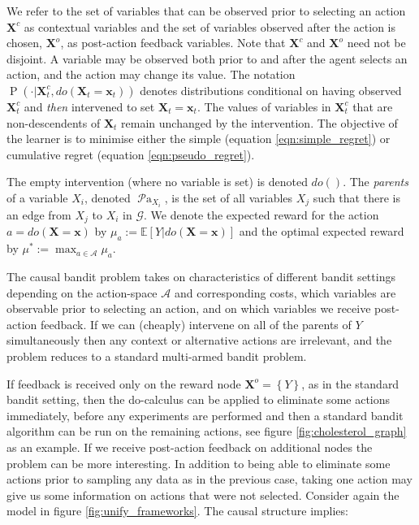 \documentclass[11pt,a4paper,twoside]{report}
\newcommand{\actions}{\mathcal{A}}
\newcommand{\actionspace}{\mathcal{A}}
\newcommand{\E}[1]{\mathbb E\left[{#1}\right]}
\newcommand{\set}[1]{\left\{#1\right\}}
\renewcommand{\P}[1]{\operatorname{P}\left(#1\right)}
\newcommand{\parents}[1]{\operatorname{\mathcal{P}a}_{#1}}
\renewcommand{\vec}[1]{\boldsymbol{#1}}
\theoremstyle{plain}
\theoremstyle{definition}
\begin{document}
We refer to the set of variables that can be observed prior to selecting an action $\vec{X}^c$ as contextual variables and the set of variables observed after the action is chosen, $\vec{X}^o$, as post-action feedback variables. Note that $\vec{X}^c$ and $\vec{X}^o$ need not be disjoint. A variable may be observed both prior to and after the agent selects an action, and the action may change its value. The notation $\P{\cdot|\vec{X}^c_t, do(\vec{X}_t = \vec{x}_t)}$ denotes distributions conditional on having observed $\vec{X}^c_t$ and \emph{then} intervened to set $\vec{X}_t = \vec{x}_t$. The values of variables in $\vec{X}^c_t$ that are non-descendents of $\vec{X}_t$ remain unchanged by the intervention. The objective of the learner is to minimise either the simple (equation \ref{eqn:simple_regret}) or cumulative regret (equation \ref{eqn:pseudo_regret}). 

The empty intervention (where no variable is set) is denoted $do()$. The \emph{parents} of a variable $X_i$, denoted $\parents{X_i}$, is the set of all variables $X_j$ such that there is an edge from $X_j$ to $X_i$ in $\mathcal{G}$. We denote the expected reward for the action $a = do(\vec{X} = \vec{x})$ by $\mu_{a} := \E{Y | do(\vec{X} = \vec{x})}$ and the optimal expected reward by $\mu^* := \max_{a\in\actions} \mu_{a}$. 

The causal bandit problem takes on characteristics of different bandit settings depending on the action-space $\actionspace$ and corresponding costs, which variables are observable prior to selecting an action, and on which variables we receive post-action feedback. If we can (cheaply) intervene on all of the parents of $Y$ simultaneously then any context or alternative actions are irrelevant, and the problem reduces to a standard multi-armed bandit problem. 


If feedback is received only on the reward node $\vec{X}^o = \set{Y}$, as in the standard bandit setting, then the do-calculus can be applied to eliminate some actions immediately, before any experiments are performed and then a standard bandit algorithm can be run on the remaining actions, see figure \ref{fig:cholesterol_graph} as an example. If we receive post-action feedback on additional nodes the problem can be more interesting. In addition to being able to eliminate some actions prior to sampling any data as in the previous case, taking one action may give us some information on actions that were not selected. Consider again the model in figure \ref{fig:unify_frameworks}. The causal structure implies: 
\end{document}
